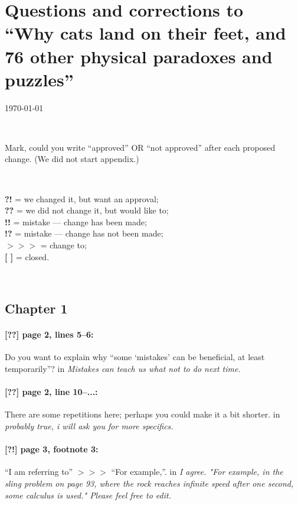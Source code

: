 \documentclass[twoside]{article}
\begin{document}
\pagestyle{empty}

\section*{Questions and corrections to\\
``Why cats land on their feet, and 76 other physical paradoxes
and puzzles''}

\today

\

Mark, could you write ``approved'' OR ``not approved'' after each proposed change.
(We did not start appendix.)

\

\noindent
\textbf{?!} = we changed it, but want an approval;\\
\textbf{??} = we did not change it, but would like to;\\
\textbf{!!} = mistake --- change has been made;\\
\textbf{!?} = mistake --- change has not been made;\\
$>\!>\!>$ = change to;
\\
\textbf{[ ]} = closed.


\

\subsection*{Chapter 1}

\paragraph{[??] page 2, lines 5--6:} Do you want to explain why “some ‘mistakes’ can be beneficial, at least temporarily”?
 in {\it  Mistakes can teach us what not to do next time. } 

\paragraph{[??] page 2, line 10--...:} There are some repetitions here; perhaps you could make it a bit shorter.
 in {\it  probably true, i will ask you for more specifics.} 

\paragraph{[?!] page 3, footnote 3:} “I am referring to” $>\!>\!>$ “For example,”.
 in {\it I agree. "For example, in the sling problem on page 93, where the rock reaches infinite speed after one second, some calculus is used." Please feel free to edit.} 
\end{document}
